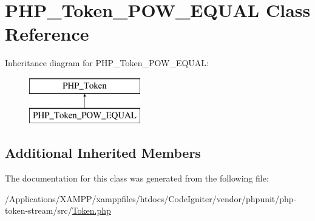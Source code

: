 \hypertarget{class_p_h_p___token___p_o_w___e_q_u_a_l}{}\section{P\+H\+P\+\_\+\+Token\+\_\+\+P\+O\+W\+\_\+\+E\+Q\+U\+AL Class Reference}
\label{class_p_h_p___token___p_o_w___e_q_u_a_l}
Inheritance diagram for P\+H\+P\+\_\+\+Token\+\_\+\+P\+O\+W\+\_\+\+E\+Q\+U\+AL\+:\begin{figure}[H]
\begin{center}
\leavevmode
\includegraphics[height=2.000000cm]{class_p_h_p___token___p_o_w___e_q_u_a_l}
\end{center}
\end{figure}
\subsection*{Additional Inherited Members}


The documentation for this class was generated from the following file\+:\begin{DoxyCompactItemize}
\item 
/\+Applications/\+X\+A\+M\+P\+P/xamppfiles/htdocs/\+Code\+Igniter/vendor/phpunit/php-\/token-\/stream/src/\mbox{\hyperlink{_token_8php}{Token.\+php}}\end{DoxyCompactItemize}
